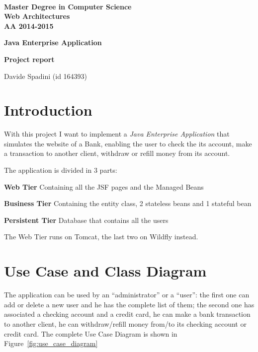\documentclass[a4paper]{article}
\begin{document}
\begin{centering}
~~~~~~~~~~~~~\\[-20mm]

  {
  \bfseries Master Degree in Computer Science\\[3mm]
  Web Architectures\\[3mm]
  AA 2014-2015
  }\\[1mm]


  \vspace{0.5cm}
  {
  \Large \bfseries{Java Enterprise Application} \par
  }
  {
  \small \bfseries{Project report} \par
  }
  \vspace{0.2cm}

  {Davide Spadini (id 164393)}

  \vspace{0.3cm}
\end{centering}



\section{Introduction}\label{introduction}
With this project I want to implement a \emph{Java Enterprise Application} that simulates the website of a Bank, enabling the user to check the its account, make a transaction to another client, withdraw or refill money from its account.

The application is divided in 3 parts:
\begin{compactitem}
  \item \textbf{Web Tier} Containing all the JSF pages and the Managed Beans
  \item \textbf{Business Tier} Containing the entity class, 2 stateless beans and 1 stateful bean
  \item \textbf{Persistent Tier} Database that contains all the users
\end{compactitem}

The Web Tier runs on Tomcat, the last two on Wildfly instead.

\section{Use Case and Class Diagram}
\label{sec:req_analysis}
The application can be used by an ``administrator'' or a ``user'': the first one can add or delete a new user and he has the complete list of them; the second one has associated a checking account and a credit card, he can make a bank transaction to another client, he can withdraw/refill money from/to its checking account or credit card. The complete Use Case Diagram is shown in Figure~\ref{fig:use_case_diagram}
\end{document}
